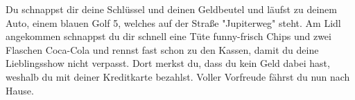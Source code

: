 \begin{questions}
\begin{parts}
Du schnappst dir deine Schlüssel und deinen Geldbeutel und läufst zu deinem Auto, einem blauen Golf 5, welches auf der Straße "Jupiterweg" steht. 
Am Lidl angekommen schnappst du dir schnell eine Tüte funny-frisch Chips und zwei Flaschen Coca-Cola und rennst fast schon zu den Kassen, damit du deine Lieblingsshow nicht verpasst. Dort merkst du, dass du kein Geld dabei hast, weshalb du mit deiner Kreditkarte bezahlst. Voller Vorfreude fährst du nun nach Hause. 
\end{parts}
\end{questions}